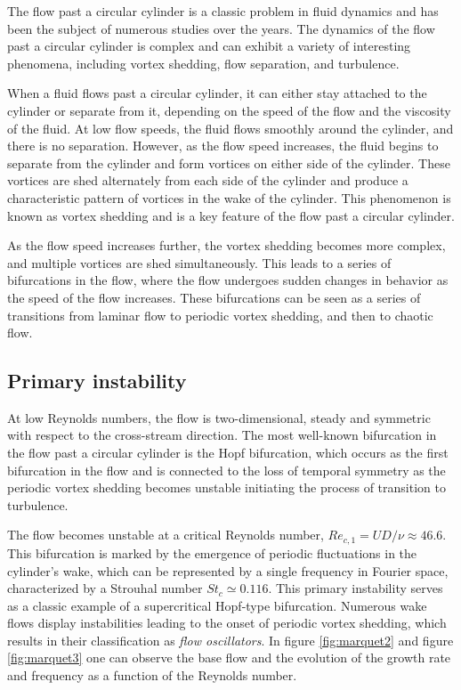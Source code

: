 \documentclass{article}
\begin{document}
The flow past a circular cylinder is a classic problem in fluid dynamics and has been the subject of numerous studies over the years. The dynamics of the flow past a circular cylinder is complex and can exhibit a variety of interesting phenomena, including vortex shedding, flow separation, and turbulence.

When a fluid flows past a circular cylinder, it can either stay attached to the cylinder or separate from it, depending on the speed of the flow and the viscosity of the fluid. At low flow speeds, the fluid flows smoothly around the cylinder, and there is no separation. However, as the flow speed increases, the fluid begins to separate from the cylinder and form vortices on either side of the cylinder. These vortices are shed alternately from each side of the cylinder and produce a characteristic pattern of vortices in the wake of the cylinder.
This phenomenon is known as vortex shedding and is a key feature of the flow past a circular cylinder.

As the flow speed increases further, the vortex shedding becomes more complex, and multiple vortices are shed simultaneously. This leads to a series of bifurcations in the flow, where the flow undergoes sudden changes in behavior as the speed of the flow increases. These bifurcations can be seen as a series of transitions from laminar flow to periodic vortex shedding, and then to chaotic flow.

\subsection{Primary instability}

At low Reynolds numbers, the flow is two-dimensional, steady and symmetric with respect to the cross-stream direction. The most well-known bifurcation in the flow past a circular cylinder is the Hopf bifurcation, which occurs as the first bifurcation in the flow and is connected to the loss of temporal symmetry as the periodic vortex shedding becomes unstable initiating the process of transition to turbulence.

The flow becomes unstable at a critical Reynolds number, $Re_{c,1} = UD/\nu \approx 46.6$. This bifurcation is marked by the emergence of periodic fluctuations in the cylinder's wake, which can be represented by a single frequency in Fourier space, characterized by a Strouhal number $St_c \simeq 0.116$. This primary instability serves as a classic example of a supercritical Hopf-type bifurcation. Numerous wake flows display instabilities leading to the onset of periodic vortex shedding, which results in their classification as \emph{flow oscillators}. In figure \ref{fig:marquet2} and figure \ref{fig:marquet3} one can observe the base flow and the evolution of the growth rate and frequency as a function of the Reynolds number.
\end{document}

